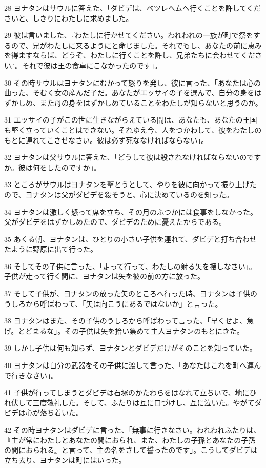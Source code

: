 \par 28 ヨナタンはサウルに答えた、「ダビデは、ベツレヘムへ行くことを許してくださいと、しきりにわたしに求めました。
\par 29 彼は言いました、『わたしに行かせてください。われわれの一族が町で祭をするので、兄がわたしに来るようにと命じました。それでもし、あなたの前に恵みを得ますならば、どうぞ、わたしに行くことを許し、兄弟たちに会わせてください』。それで彼は王の食卓にこなかったのです」。
\par 30 その時サウルはヨナタンにむかって怒りを発し、彼に言った、「あなたは心の曲った、そむく女の産んだ子だ。あなたがエッサイの子を選んで、自分の身をはずかしめ、また母の身をはずかしめていることをわたしが知らないと思うのか。
\par 31 エッサイの子がこの世に生きながらえている間は、あなたも、あなたの王国も堅く立っていくことはできない。それゆえ今、人をつかわして、彼をわたしのもとに連れてこさせなさい。彼は必ず死ななければならない」。
\par 32 ヨナタンは父サウルに答えた、「どうして彼は殺されなければならないのですか。彼は何をしたのですか」。
\par 33 ところがサウルはヨナタンを撃とうとして、やりを彼に向かって振り上げたので、ヨナタンは父がダビデを殺そうと、心に決めているのを知った。
\par 34 ヨナタンは激しく怒って席を立ち、その月のふつかには食事をしなかった。父がダビデをはずかしめたので、ダビデのために憂えたからである。
\par 35 あくる朝、ヨナタンは、ひとりの小さい子供を連れて、ダビデと打ち合わせたように野原に出て行った。
\par 36 そしてその子供に言った、「走って行って、わたしの射る矢を捜しなさい」。子供が走って行く間に、ヨナタンは矢を彼の前の方に放った。
\par 37 そして子供が、ヨナタンの放った矢のところへ行った時、ヨナタンは子供のうしろから呼ばわって、「矢は向こうにあるではないか」と言った。
\par 38 ヨナタンはまた、その子供のうしろから呼ばわって言った、「早くせよ、急げ。とどまるな」。その子供は矢を拾い集めて主人ヨナタンのもとにきた。
\par 39 しかし子供は何も知らず、ヨナタンとダビデだけがそのことを知っていた。
\par 40 ヨナタンは自分の武器をその子供に渡して言った、「あなたはこれを町へ運んで行きなさい」。
\par 41 子供が行ってしまうとダビデは石塚のかたわらをはなれて立ちいで、地にひれ伏して三度敬礼した。そして、ふたりは互に口づけし、互に泣いた。やがてダビデは心が落ち着いた。
\par 42 その時ヨナタンはダビデに言った、「無事に行きなさい。われわれふたりは、『主が常にわたしとあなたの間におられ、また、わたしの子孫とあなたの子孫の間におられる』と言って、主の名をさして誓ったのです」。こうしてダビデは立ち去り、ヨナタンは町にはいった。

